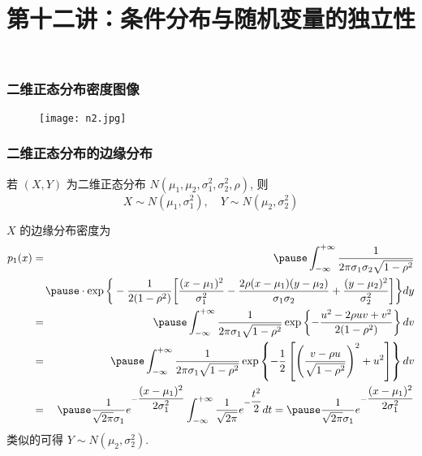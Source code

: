 \begin{frame}
	\frametitle{二维正态分布密度图像}
	\vspace{0.2cm}
	\begin{figure}[h]
		\centering
		\texttt{[image: n2.jpg]}
	\end{figure}
\end{frame}
\begin{frame}
	\frametitle{二维正态分布的边缘分布}
	\vspace{-0.3cm}
	\begin{thm}
		若 $(X,Y)$ 为二维正态分布 $N (\mu_1,\mu_2,\sigma_1^2,\sigma_2^2,\rho)$, 则 $$X\sim N (\mu_1,\sigma_1^2), \quad Y\sim N (\mu_2,\sigma_2^2)$$
	\end{thm}
	\vspace{-0.1cm}
	\pause\zheng $X$ 的边缘分布密度为
	{\small \begin{eqnarray*}
			p_1(x)&=&\pause \int_{-\infty}^{+\infty}\dfrac{1}{2\pi \sigma_1\sigma_2\sqrt{1-\rho^2}}\\
			&&\hspace{-0.3cm}\pause\cdot \exp\bigg\{-\dfrac{1}{2(1-\rho^2)}\bigg[\dfrac{(x-\mu_1)^2}{\sigma_1^2}-\dfrac{2\rho(x-\mu_1)(y-\mu_2)}{\sigma_1\sigma_2}+\dfrac{(y-\mu_2)^2}{\sigma_2^2}\bigg]\bigg\}dy\\
			&=&\pause \int_{-\infty}^{+\infty}\dfrac{1}{2\pi \sigma_1\sqrt{1-\rho^2}}\exp\left\{-\dfrac{u^2-2\rho uv+v^2}{2(1-\rho^2)}\right\}dv\\
			&=&\pause \int_{-\infty}^{+\infty}\dfrac{1}{2\pi \sigma_1\sqrt{1-\rho^2}}\exp\left\{-\dfrac{1}{2}\left[\left(\dfrac{v-\rho u}{\sqrt{1-\rho^2}}\right)^2+u^2\right]\right\}dv\\
			&=&\pause \dfrac{1}{\sqrt{2\pi}\sigma_1}e^{-\dfrac{(x-\mu_1)^2}{2\sigma_1^2}}\int_{-\infty}^{+\infty}\dfrac{1}{\sqrt{2\pi}} e^{-\dfrac{t^2}{2}}dt=\pause \dfrac{1}{\sqrt{2\pi}\sigma_1}e^{-\dfrac{(x-\mu_1)^2}{2\sigma_1^2}}
	\end{eqnarray*}}
	\pause 类似的可得 $Y\sim N (\mu_2,\sigma_2^2)$.
\end{frame}








\title[概率论]{第十二讲：条件分布与随机变量的独立性}
\date{}





